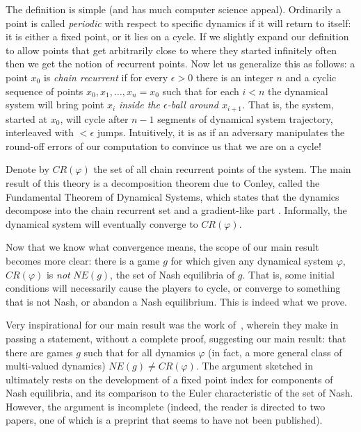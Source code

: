 \documentclass[11pt]{article}
\begin{document}
The definition is simple (and has much computer science appeal). Ordinarily a point is called {\em \color{black} periodic} with respect to specific dynamics if it will return to itself: it is either a fixed point, or it lies on a cycle. {\color{black} If we slightly expand our definition to allow points that get arbitrarily close to where they started infinitely often then we get the notion of {\emph recurrent points}.} Now let us generalize this as follows:  a point $x_0$ is {\em chain recurrent} if for every $\epsilon>0$ there is an integer $n$ and a cyclic sequence of points $x_0, x_1,\ldots,x_n =x_0$ such that for each $i<n$ the dynamical system will bring point $x_i$ {\em inside the $\epsilon$-ball around $x_{i+1}$.}  That is, the system, started at $x_0$, will cycle after $n-1$ segments of dynamical system trajectory, interleaved with $<\epsilon$ jumps. Intuitively, it is as if an adversary manipulates the round-off errors of our computation to convince us that we are on a cycle!   

Denote by $CR(\varphi)$ the set of all chain recurrent points of the system. The main result of this theory is a decomposition theorem due to Conley, called the Fundamental Theorem of Dynamical Systems, which states that the dynamics decompose into the chain recurrent set and a gradient-like part \citep{conley1978isolated}.  Informally, the dynamical system will eventually converge to $CR(\varphi)$.  

Now that we know what convergence means, the scope of our main result becomes more clear: there is a game $g$ for which given any dynamical system $\varphi$,  $CR(\varphi)$ is \emph{not} $NE(g)$, the set of Nash equilibria of $g$.
That is, some initial conditions will necessarily cause the players to cycle, or converge to something that is not Nash, or abandon a Nash equilibrium. This is indeed what we prove.

Very inspirational for our main result was the work of~\citep{sorin_benaim}, wherein they make in passing a statement, without a complete proof, suggesting our main result: that there are games $g$ such that for all dynamics $\varphi$ (in fact, a more general class of multi-valued dynamics)  $NE(g)\neq CR(\varphi)$. The argument sketched in~\citep{sorin_benaim} ultimately rests on the development of a fixed point index for components of Nash equilibria, and its comparison to the Euler characteristic of the set of Nash. However, the argument is incomplete (indeed, the reader is directed to two papers, one of which is a preprint that seems to have not been published).   
\end{document}
